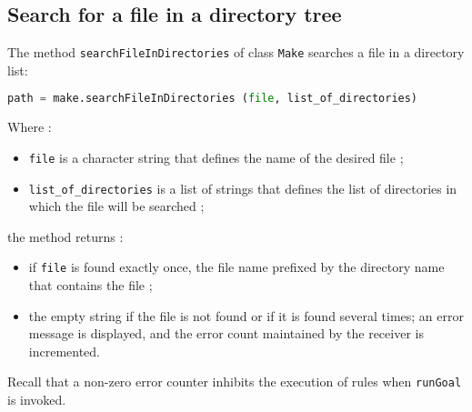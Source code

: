 \documentclass[a4paper,11pt]{extarticle}
\begin{document}
\subsection{Search for a file in a directory tree}

The method \texttt{searchFileInDirectories} of class \texttt{Make} searches a file in a directory list:
\begin{lstlisting}[language=py]
path = make.searchFileInDirectories (file, list_of_directories)
\end{lstlisting}
Where :
\begin{itemize}
  \item \texttt{file} is a character string that defines the name of the desired file ;
  \item \texttt{list\_of\_directories} is a list of strings that defines the list of directories in which the file will be searched ;
\end{itemize}
the method returns :
\begin{itemize}
  \item if \texttt{file} is found exactly once, the file name prefixed by the directory name that contains the file ;
  \item the empty string if the file is not found or if it is found several times; an error message is displayed, and the error count maintained by the receiver is incremented.
\end{itemize}

Recall that a non-zero error counter inhibits the execution of rules when \texttt{runGoal}  is invoked.

\end{document}
